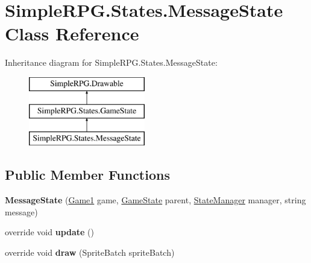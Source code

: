 \hypertarget{class_simple_r_p_g_1_1_states_1_1_message_state}{\section{Simple\+R\+P\+G.\+States.\+Message\+State Class Reference}
\label{class_simple_r_p_g_1_1_states_1_1_message_state}
}
Inheritance diagram for Simple\+R\+P\+G.\+States.\+Message\+State\+:\begin{figure}[H]
\begin{center}
\leavevmode
\includegraphics[height=3.000000cm]{class_simple_r_p_g_1_1_states_1_1_message_state}
\end{center}
\end{figure}
\subsection*{Public Member Functions}
\begin{DoxyCompactItemize}
\item 
\hypertarget{class_simple_r_p_g_1_1_states_1_1_message_state_a34cf4aff1d373a0dfb3a3fb663396fab}{{\bfseries Message\+State} (\hyperlink{class_simple_r_p_g_1_1_game1}{Game1} game, \hyperlink{class_simple_r_p_g_1_1_states_1_1_game_state}{Game\+State} parent, \hyperlink{class_simple_r_p_g_1_1_states_1_1_state_manager}{State\+Manager} manager, string message)}\label{class_simple_r_p_g_1_1_states_1_1_message_state_a34cf4aff1d373a0dfb3a3fb663396fab}

\item 
\hypertarget{class_simple_r_p_g_1_1_states_1_1_message_state_a400422f08ad5f53cf408e861695a3648}{override void {\bfseries update} ()}\label{class_simple_r_p_g_1_1_states_1_1_message_state_a400422f08ad5f53cf408e861695a3648}

\item 
\hypertarget{class_simple_r_p_g_1_1_states_1_1_message_state_ae1a03eead4c1e591e8d26c99dff899b9}{override void {\bfseries draw} (Sprite\+Batch sprite\+Batch)}\label{class_simple_r_p_g_1_1_states_1_1_message_state_ae1a03eead4c1e591e8d26c99dff899b9}

\end{DoxyCompactItemize}
